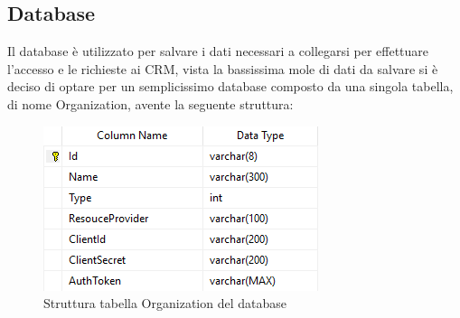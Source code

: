 \subsection{Database}
Il database è utilizzato per salvare i dati necessari a collegarsi per effettuare l'accesso e le richieste ai \gls{CRM}, vista la bassissima mole di dati da salvare si è deciso di optare per un semplicissimo database  composto da una singola tabella, di nome Organization, avente la seguente struttura:
\begin{figure}[H]
	\centering
	\includegraphics[width=0.7\linewidth]{images/schemaDB}
	\caption{Struttura tabella Organization del database}
	\label{fig:schemadb}
\end{figure}

